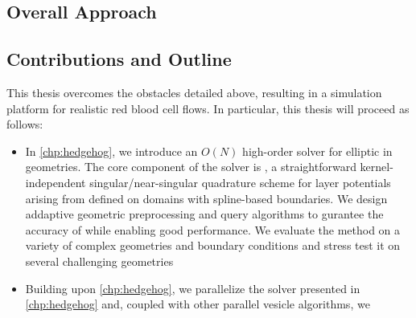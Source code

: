 \subsection{Overall Approach}
\subsection{Contributions and Outline}
This thesis overcomes the obstacles detailed above, resulting in a simulation platform for realistic red blood cell flows.
In particular, this thesis will proceed as follows:
\begin{itemize}
    \item In \cref{chp:hedgehog}, we introduce an $O(N)$ high-order solver for elliptic \pdes in \threed geometries.
        The core component of the solver is \qbkix, a straightforward kernel-independent singular/near-singular quadrature scheme for layer potentials arising from \pdes defined on domains with spline-based boundaries.
        We design addaptive geometric preprocessing and query algorithms to gurantee the accuracy of \qbkix while enabling good performance. 
        We evaluate the method on a variety of complex geometries and boundary conditions and stress test it on several challenging geometries
    \item Building upon \cref{chp:hedgehog}, we parallelize the solver presented in \cref{chp:hedgehog} and, coupled with other parallel vesicle algorithms, we
\end{itemize}
